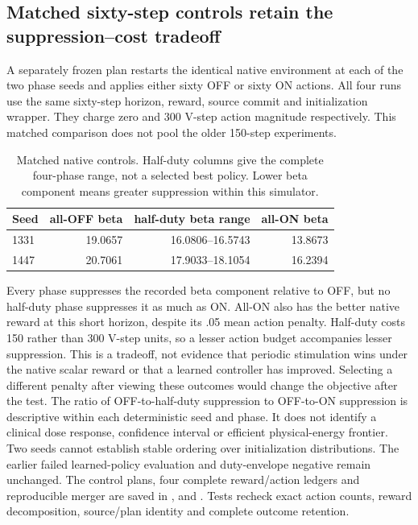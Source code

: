 \subsection{Matched sixty-step controls retain the suppression--cost tradeoff}
A separately frozen plan restarts the identical native environment at each of the two phase seeds and applies either sixty OFF or sixty ON actions. All four runs use the same sixty-step horizon, reward, source commit and initialization wrapper. They charge zero and 300 V-step action magnitude respectively. This matched comparison does not pool the older 150-step experiments.
\begin{table}[ht]\centering
\caption{Matched native controls. Half-duty columns give the complete four-phase range, not a selected best policy. Lower beta component means greater suppression within this simulator.}
\begin{tabular}{lrrr}\hline
Seed & all-OFF beta & half-duty beta range & all-ON beta\\\hline
1331 &19.0657&16.0806--16.5743&13.8673\\
1447 &20.7061&17.9033--18.1054&16.2394\\\hline
\end{tabular}\end{table}
Every phase suppresses the recorded beta component relative to OFF, but no half-duty phase suppresses it as much as ON. All-ON also has the better native reward at this short horizon, despite its .05 mean action penalty. Half-duty costs 150 rather than 300 V-step units, so a lesser action budget accompanies lesser suppression. This is a tradeoff, not evidence that periodic stimulation wins under the native scalar reward or that a learned controller has improved. Selecting a different penalty after viewing these outcomes would change the objective after the test.
The ratio of OFF-to-half-duty suppression to OFF-to-ON suppression is descriptive within each deterministic seed and phase. It does not identify a clinical dose response, confidence interval or efficient physical-energy frontier. Two seeds cannot establish stable ordering over initialization distributions. The earlier failed learned-policy evaluation and duty-envelope negative remain unchanged. The control plans, four complete reward/action ledgers and reproducible merger are saved in ,  and . Tests recheck exact action counts, reward decomposition, source/plan identity and complete outcome retention.

